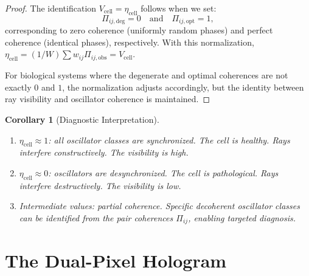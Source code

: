 \documentclass[11pt,twocolumn,a4paper]{article}
\newtheorem{corollary}[theorem]{Corollary}
\newcommand{\etacell}{\eta_{\mathrm{cell}}}
\newcommand{\Vcell}{V_{\mathrm{cell}}}
\begin{document}
\begin{proof}
The identification $\Vcell = \etacell$ follows when we set:
\begin{equation}
\Pi_{ij,\mathrm{deg}} = 0 \quad \text{and} \quad
\Pi_{ij,\mathrm{opt}} = 1,
\end{equation}
corresponding to zero coherence (uniformly random phases) and perfect
coherence (identical phases), respectively. With this normalization,
$\etacell = (1/W) \sum w_{ij} \Pi_{ij,\mathrm{obs}} = \Vcell$.

For biological systems where the degenerate and optimal coherences
are not exactly $0$ and $1$, the normalization adjusts accordingly,
but the identity between ray visibility and oscillator coherence
is maintained.
\end{proof}

\begin{corollary}[Diagnostic Interpretation]
\label{cor:diagnostic}
\begin{enumerate}[label=(\roman*),leftmargin=*]
\item $\etacell \approx 1$: all oscillator classes are synchronized.
  The cell is healthy. Rays interfere constructively. The visibility
  is high.
\item $\etacell \approx 0$: oscillators are desynchronized. The cell
  is pathological. Rays interfere destructively. The visibility is
  low.
\item Intermediate values: partial coherence. Specific decoherent
  oscillator classes can be identified from the pair coherences
  $\Pi_{ij}$, enabling targeted diagnosis.
\end{enumerate}
\end{corollary}




\section{The Dual-Pixel Hologram}
\label{sec:dual-pixel}
\end{document}
